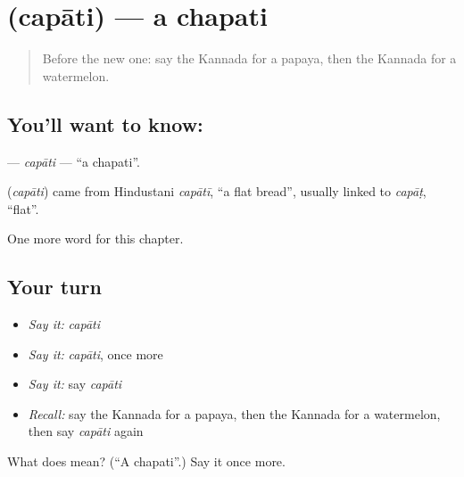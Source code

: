 \section[\texorpdfstring{\kn{ಚಪಾತಿ} (capāti)}{ಚಪಾತಿ (capāti)}]{ (capāti) — a chapati}

\label{lesson:KA-C221-capati}



\begin{quote}
Before the new one: say the Kannada for a papaya, then the Kannada for a watermelon.
\end{quote}

\subsection*{You'll want to know: }
\textbf{} — \emph{capāti} — \textquotedblleft{}a chapati\textquotedblright{}.

\begin{cousinweb}
\textbf{} (\emph{capāti}) came from Hindustani \emph{capātī}, \textquotedblleft{}a flat bread\textquotedblright{}, usually linked to \emph{capāṭ}, \textquotedblleft{}flat\textquotedblright{}.
\end{cousinweb}

\begin{grammarlens}[title={What you've built}]
One more word for this chapter.
\end{grammarlens}

\subsection*{Your turn}
\begin{itemize}
\raggedright
  \item \emph{Say it:} \emph{capāti}
  \item \emph{Say it:} \emph{capāti}, once more
  \item \emph{Say it:} say \emph{capāti}
  \item \emph{Recall:} say the Kannada for a papaya, then the Kannada for a watermelon, then say \emph{capāti} again
\end{itemize}

\begin{tcolorbox}[breakable,colback=teal!4,colframe=teal!35!black,title={Before you move on}]
What does  mean? (\textquotedblleft{}A chapati\textquotedblright{}.) Say it once more.
\end{tcolorbox}
